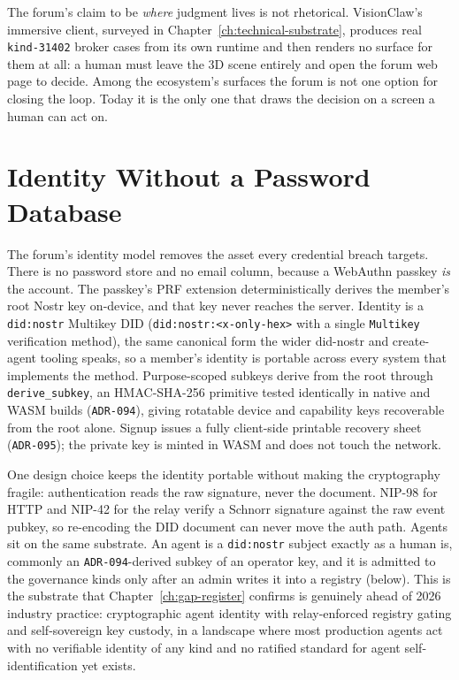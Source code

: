The forum's claim to be \emph{where} judgment lives is not rhetorical. VisionClaw's immersive client, surveyed in Chapter~\ref{ch:technical-substrate}, produces real \texttt{kind-31402} broker cases from its own runtime and then renders no surface for them at all: a human must leave the 3D scene entirely and open the forum web page to decide. Among the ecosystem's surfaces the forum is not one option for closing the loop. Today it is the only one that draws the decision on a screen a human can act on.

\section{Identity Without a Password Database}

The forum's identity model removes the asset every credential breach targets. There is no password store and no email column, because a WebAuthn passkey \emph{is} the account. The passkey's PRF extension deterministically derives the member's root Nostr key on-device, and that key never reaches the server. Identity is a \texttt{did:nostr} Multikey DID (\texttt{did:nostr:<x-only-hex>} with a single \texttt{Multikey} verification method), the same canonical form the wider did-nostr and create-agent tooling speaks, so a member's identity is portable across every system that implements the method. Purpose-scoped subkeys derive from the root through \texttt{derive\_subkey}, an HMAC-SHA-256 primitive tested identically in native and WASM builds (\texttt{ADR-094}), giving rotatable device and capability keys recoverable from the root alone. Signup issues a fully client-side printable recovery sheet (\texttt{ADR-095}); the private key is minted in WASM and does not touch the network.

One design choice keeps the identity portable without making the cryptography fragile: authentication reads the raw signature, never the document. NIP-98 for HTTP and NIP-42 for the relay verify a Schnorr signature against the raw event pubkey, so re-encoding the DID document can never move the auth path. Agents sit on the same substrate. An agent is a \texttt{did:nostr} subject exactly as a human is, commonly an \texttt{ADR-094}-derived subkey of an operator key, and it is admitted to the governance kinds only after an admin writes it into a registry (below). This is the substrate that Chapter~\ref{ch:gap-register} confirms is genuinely ahead of 2026 industry practice: cryptographic agent identity with relay-enforced registry gating and self-sovereign key custody, in a landscape where most production agents act with no verifiable identity of any kind and no ratified standard for agent self-identification yet exists.

